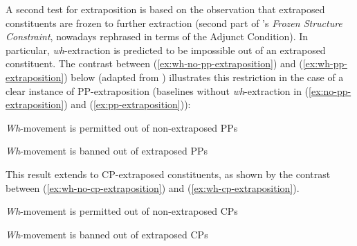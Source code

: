 \documentclass[11pt]{article}
\begin{document}
A second test for extraposition is based on the observation that extraposed constituents are frozen to further extraction (second part of \cite{Ross1967}'s \textit{Frozen Structure Constraint}, nowadays rephrased in terms of the Adjunct Condition). In particular, \textit{wh}-extraction is predicted to be impossible out of an extraposed constituent. The contrast between (\ref{ex:wh-no-pp-extraposition}) and (\ref{ex:wh-pp-extraposition}) below (adapted from \cite{Keller1995}) illustrates this restriction in the case of a clear instance of PP-extraposition (baselines without \textit{wh}-extraction in (\ref{ex:no-pp-extraposition}) and (\ref{ex:pp-extraposition})):
\begin{exe}
	\ex \textit{Wh}-movement is permitted out of non-extraposed PPs
	\begin{xlist}
		 \label{ex:no-pp-extraposition}
		 \label{ex:wh-no-pp-extraposition}
	\end{xlist}
	\ex \textit{Wh}-movement is banned out of extraposed PPs
	\begin{xlist}
		\label{ex:pp-extraposition}
		\label{ex:wh-pp-extraposition}
	\end{xlist}
\end{exe}
	 This result extends to CP-extraposed constituents, as shown by the contrast between (\ref{ex:wh-no-cp-extraposition}) and (\ref{ex:wh-cp-extraposition}).
	\begin{exe}
		\ex \textit{Wh}-movement is permitted out of non-extraposed CPs
		\begin{xlist}
			 \label{ex:no-cp-extraposition}
			\label{ex:wh-no-cp-extraposition}
		\end{xlist}
		\ex \textit{Wh}-movement is banned out of extraposed CPs
		\begin{xlist}
			 \label{ex:cp-extraposition}
			\label{ex:wh-cp-extraposition}
		\end{xlist}
	\end{exe}
\end{document}
